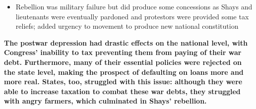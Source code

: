 \documentclass[a4paper]{article}
\begin{document}
{\begin{itemize}
\begin{itemize}
\begin{itemize}
                    \item Rebellion was military failure but did produce some concessions as Shays and lieutenants were eventually pardoned and protestors were provided some tax reliefs; added urgency to movement to produce new national constitution
                \end{itemize}
            \end{itemize}
        \end{itemize}
        \textbf{The postwar depression had drastic effects on the national level, with Congress' inability to tax preventing them from paying of their war debt. Furthermore, many of their essential policies were rejected on the state level, making the prospect of defaulting on loans more and more real. States, too, struggled with this issue: although they were able to increase taxation to combat these war debts, they struggled with angry farmers, which culminated in Shays' rebellion.}}
    
\end{document}
